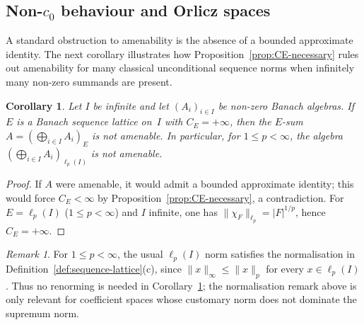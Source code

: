 \documentclass[reqno]{amsart}
\theoremstyle{plain}
\newtheorem{corollary}[theorem]{Corollary}
\theoremstyle{definition}
\theoremstyle{remark}
\newtheorem{remark}[theorem]{Remark}
\renewcommand{\le}{\leqslant}
\begin{document}
\subsection{Non-$c_0$ behaviour and Orlicz spaces}


A standard obstruction to amenability is the absence of a bounded approximate identity.
The next corollary illustrates how Proposition~\ref{prop:CE-necessary} rules out amenability for many
classical unconditional sequence norms when infinitely many non-zero summands are present.

\begin{corollary}\label{cor:lp-not-amenable}
Let $I$ be infinite and let $(A_i)_{i\in I}$ be non-zero Banach algebras.
If $E$ is a Banach sequence lattice on~$I$ with $C_E=+\infty$, then the $E$-sum
$A=(\bigoplus_{i\in I}A_i)_E$ is not amenable.
In particular, for $1\le p<\infty$, the algebra $(\bigoplus_{i\in I}A_i)_{\ell_p(I)}$ is not amenable.
\end{corollary}

\begin{proof}
If $A$ were amenable, it would admit a bounded approximate identity; this would force $C_E<\infty$ by
Proposition~\ref{prop:CE-necessary}, a contradiction.
For $E=\ell_p(I)$ ($1\le p<\infty$) and $I$ infinite, one has $\|\chi_F\|_{\ell_p}=|F|^{1/p}$, hence $C_E=+\infty$.
\end{proof}

\begin{remark}\label{rem:lp-normalisation}
For $1\le p<\infty$, the usual $\ell_p(I)$ norm satisfies the normalisation in
Definition~\ref{def:sequence-lattice}(c), since $\|x\|_\infty\le \|x\|_p$ for every
$x\in\ell_p(I)$.  Thus no renorming is needed in Corollary~\ref{cor:lp-not-amenable}; the
normalisation remark above is only relevant for coefficient spaces whose customary norm does
not dominate the supremum norm.
\end{remark}
\end{document}
